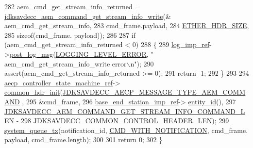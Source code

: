 \begin{DoxyCode}
282     aem\_cmd\_get\_stream\_info\_returned = 
      \hyperlink{group__command__get__stream__info_gadc285f26ae5f9e8931b21e4712684f1a}{jdksavdecc\_aem\_command\_get\_stream\_info\_write}(&
      aem\_cmd\_get\_stream\_info,
283                                                                                     cmd\_frame.payload,
284                                                                                     
      \hyperlink{namespaceavdecc__lib_a6c827b1a0d973e18119c5e3da518e65ca9512ad9b34302ba7048d88197e0a2dc0}{ETHER\_HDR\_SIZE},
285                                                                                     \textcolor{keyword}{sizeof}(cmd\_frame.
      payload));
286 
287     \textcolor{keywordflow}{if} (aem\_cmd\_get\_stream\_info\_returned < 0)
288     \{
289         \hyperlink{namespaceavdecc__lib_acbe3e2a96ae6524943ca532c87a28529}{log\_imp\_ref}->\hyperlink{classavdecc__lib_1_1log_a68139a6297697e4ccebf36ccfd02e44a}{post\_log\_msg}(\hyperlink{namespaceavdecc__lib_a501055c431e6872ef46f252ad13f85cdaf2c4481208273451a6f5c7bb9770ec8a}{LOGGING\_LEVEL\_ERROR}, \textcolor{stringliteral}{"
      aem\_cmd\_get\_stream\_info\_write error\(\backslash\)n"});
290         assert(aem\_cmd\_get\_stream\_info\_returned >= 0);
291         \textcolor{keywordflow}{return} -1;
292     \}
293 
294     \hyperlink{namespaceavdecc__lib_a0b1b5aea3c0490f77cbfd9178af5be22}{aecp\_controller\_state\_machine\_ref}->
      \hyperlink{classavdecc__lib_1_1aecp__controller__state__machine_aafc737d7ed17a62fed9df6528f18d3ec}{common\_hdr\_init}(\hyperlink{group__aecp__message__type_ga4625ce189cc209f42deb0629f48faf69}{JDKSAVDECC\_AECP\_MESSAGE\_TYPE\_AEM\_COMMAND}
      ,
295                                                        &cmd\_frame,
296                                                        \hyperlink{classavdecc__lib_1_1descriptor__base__imp_a550c969411f5f3b69f55cc139763d224}{base\_end\_station\_imp\_ref}->
      \hyperlink{classavdecc__lib_1_1end__station__imp_a363b6c9664a0d701def9b17863e20ad3}{entity\_id}(),
297                                                        
      \hyperlink{group__command__get__stream__info_gaae48a0ac802bc8fdeaacfa15f4679e2a}{JDKSAVDECC\_AEM\_COMMAND\_GET\_STREAM\_INFO\_COMMAND\_LEN} -
298                                                            
      \hyperlink{group__jdksavdecc__avtp__common__control__header_gaae84052886fb1bb42f3bc5f85b741dff}{JDKSAVDECC\_COMMON\_CONTROL\_HEADER\_LEN});
299     \hyperlink{namespaceavdecc__lib_a6dd511685627c0865a3442b539a4e8e9}{system\_queue\_tx}(notification\_id, \hyperlink{namespaceavdecc__lib_aabcadff06aa62be0ce47bc0646823604aba48b8a017e06fb240b650cdea965178}{CMD\_WITH\_NOTIFICATION}, cmd\_frame.
      payload, cmd\_frame.length);
300 
301     \textcolor{keywordflow}{return} 0;
302 \}
\end{DoxyCode}


